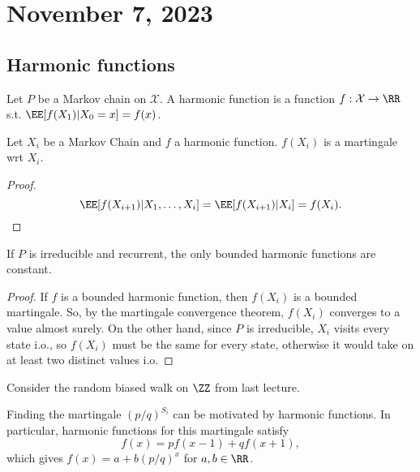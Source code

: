 \section{November 7, 2023}

\subsection{Harmonic functions}

\begin{definition}

Let $P$ be a Markov chain on $\mathcal{X}$. A \ac{harmonic function} is a function $f: \mathcal{X}\rightarrow \RR$ s.t. $\EE[f(X_1)|X_0=x] = f(x)$.  
\end{definition}

\begin{theorem}
\proplabel

Let $X_i$ be a Markov Chain and $f$ a harmonic function. $f(X_i)$ is a martingale wrt $X_i$.
\end{theorem}

\begin{proof}
	\[\EE[f(X_{i+1})|X_1,\hdots,X_i] = \EE[f(X_{i+1})|X_i] = f(X_i).\] 
\end{proof}

\begin{theorem}
\proplabel

If $P$ is irreducible and recurrent, the only bounded harmonic functions are constant.
\end{theorem}

\begin{proof}
If $f$ is a bounded harmonic function, then $f(X_i)$ is a bounded martingale. So, by the martingale convergence theorem, $f(X_i)$ converges to a value almost surely. On the other hand, since $P$ is irreducible, $X_i$ visits every state i.o., so $f(X_i)$ must be the same for every state, otherwise it would take on at least two distinct values i.o. 
\end{proof}

\begin{example}
\exlabel

Consider the random biased walk on $\ZZ$ from last lecture. 
\end{example}

Finding the martingale $(p/q)^{S_i}$ can be motivated by harmonic functions. In particular, harmonic functions for this martingale satisfy 
\[f(x) = pf(x-1) + qf(x+1),\]
which gives $f(x) = a + b(p/q)^x$ for $a,b\in \RR$.

